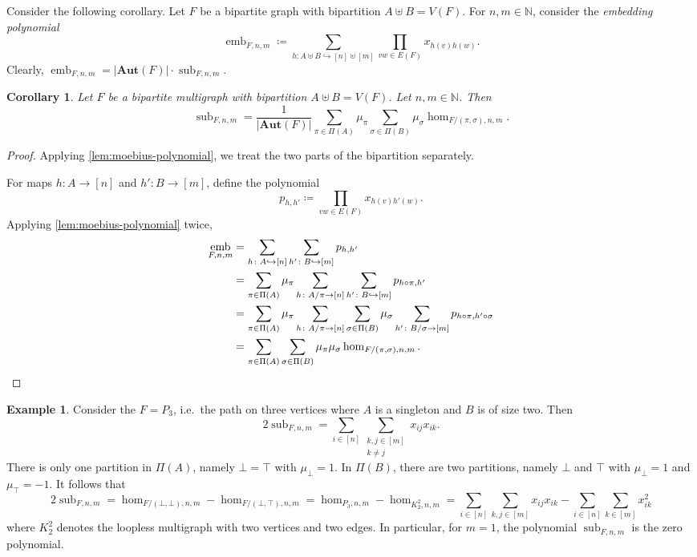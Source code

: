 \documentclass[10pt,a4paper]{article}
\theoremstyle{definition}
\newtheorem{example}[definition]{Example}
\theoremstyle{plain}
\newtheorem{corollary}[definition]{Corollary}
\theoremstyle{remark}
\DeclareMathOperator{\sub}{sub}
\DeclareMathOperator{\emb}{emb}
\newcommand{\Aut}{\mathbf{Aut}}
\begin{document}
	Consider the following corollary.
	Let $F$ be a bipartite graph with bipartition $A \uplus B = V(F)$.
	For $n, m\in \mathbb{N}$, consider the \emph{embedding polynomial}
	\[
	\emb_{F, n,m} \coloneqq \sum_{h \colon A \uplus B \hookrightarrow [n] \uplus [m]} \prod_{vw \in E(F)} x_{h(v)h(w)}.
	\]
	Clearly, $\emb_{F, n,m} = |\Aut(F)| \cdot \sub_{F, n,m}$.
	
	
	\begin{corollary} \label{thm:sub-hom}
		Let $F$ be a bipartite multigraph with bipartition $A \uplus B = V(F)$.
		Let $n,m \in \mathbb{N}$.
		Then
		\[
		\sub_{F, n,m} = \frac{1}{|\Aut(F)|} \sum_{\pi \in \Pi(A)} \mu_{\pi} \sum_{\sigma \in \Pi(B)} \mu_{\sigma} \hom_{F/(\pi, \sigma), n, m}.
		\]
	\end{corollary}
	
	\begin{proof}
		Applying \cref{lem:moebius-polynomial},
		we treat the two parts of the bipartition separately.
	
		For maps $h \colon A \to [n]$ and $h' \colon B \to [m]$, define the polynomial
		\[
			p_{h,h'} \coloneqq \prod_{vw \in E(F)} x_{h(v)h'(w)}.
		\]
		Applying \cref{lem:moebius-polynomial} twice,
		\begin{align*}
			\emb_{F, n, m} 
			&= \sum_{h \colon A \hookrightarrow [n]} \sum_{h' \colon B \hookrightarrow [m]} p_{h,h'} \\
			&= \sum_{\pi \in \Pi(A)} \mu_\pi \sum_{h \colon A/\pi \to [n]} \sum_{h' \colon B \hookrightarrow [m]} p_{h \circ \pi,h'} \\
			&= \sum_{\pi \in \Pi(A)} \mu_\pi \sum_{h \colon A/\pi \to [n]} \sum_{\sigma \in \Pi(B)} \mu_\sigma \sum_{h' \colon B/\sigma \to [m]} p_{h \circ \pi, h' \circ \sigma} \\
			&= \sum_{\pi \in \Pi(A)} \sum_{\sigma \in \Pi(B)} \mu_\pi \mu_\sigma \hom_{F/(\pi, \sigma), n,m}. \qedhere
		\end{align*}
	\end{proof}
	
	\begin{example}
		Consider the $F = P_3$, i.e.\ the path on three vertices where $A$ is a singleton and $B$ is of size two. Then
		\[
		2\sub_{F, n, m} = \sum_{i \in [n]} \sum_{\substack{k, j \in [m] \\ k \neq j}} x_{ij}x_{ik}.
		\]
		There is only one partition in $\Pi(A)$, namely $\bot = \top$ with $\mu_\bot = 1$.
		In $\Pi(B)$, there are two partitions, namely $\bot$ and $\top$ with $\mu_\bot = 1$ and $\mu_\top = -1$.
		It follows that
		\[
		2\sub_{F, n, m} =  \hom_{F/(\bot, \bot), n,m} - \hom_{F/(\bot, \top), n,m}
		= \hom_{P_3, n, m} - \hom_{K_2^2, n, m}
		=  \sum_{i \in [n]} \sum_{k, j \in [m]} x_{ij}x_{ik} - \sum_{i \in [n]} \sum_{k \in [m]} x_{ik}^2
		\]
		where $K_2^2$ denotes the loopless multigraph with two vertices and two edges.
		In particular, for $m = 1$, the polynomial $\sub_{F, n, m}$ is the zero polynomial.
	\end{example}
	
\end{document}
